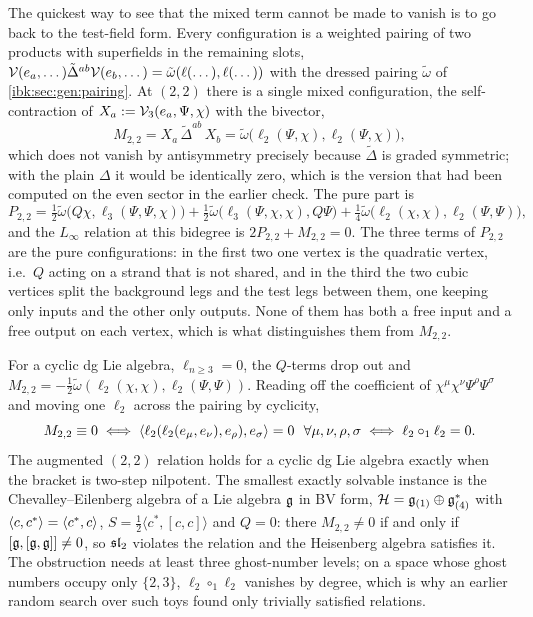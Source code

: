 The quickest way to see that the mixed term cannot be made to vanish is to go back to the test-field form. Every configuration is a weighted pairing of two products with superfields in the remaining slots, ${\mathcal{V}}(e_a,\dots)\tilde\Delta^{ab}{\mathcal{V}}(e_b,\dots)=\tilde\omega(\ell(\dots),\ell(\dots))$ with the dressed pairing $\tilde\omega$ of \cref{ibk:sec:gen:pairing}. At $(2,2)$ there is a single mixed configuration, the self-contraction of $X_a:={\mathcal{V}}_3(e_a,\Psi,\chi)$ with the bivector,
\begin{equation}
  \label{ibk:eq:comp:M22}
  M_{2,2}
    = X_a\,\tilde\Delta^{ab}\,X_b
    = \tilde\omega\bigl(\ell_2(\Psi,\chi),\ell_2(\Psi,\chi)\bigr),
\end{equation}
which does not vanish by antisymmetry precisely because $\tilde\Delta$ is graded symmetric; with the plain $\Delta$ it would be identically zero, which is the version that had been computed on the even sector in the earlier check. The pure part is
\begin{equation}
  \label{ibk:eq:comp:P22}
  P_{2,2}
    = \tfrac12\tilde\omega\bigl(Q\chi,\ell_3(\Psi,\Psi,\chi)\bigr)
      + \tfrac12\tilde\omega\bigl(\ell_3(\Psi,\chi,\chi),Q\Psi\bigr)
      + \tfrac14\tilde\omega\bigl(\ell_2(\chi,\chi),\ell_2(\Psi,\Psi)\bigr),
\end{equation}
and the $L_\infty$ relation at this bidegree is $2P_{2,2}+M_{2,2}=0$. The three terms of $P_{2,2}$ are the pure configurations: in the first two one vertex is the quadratic vertex, i.e.\ $Q$ acting on a strand that is not shared, and in the third the two cubic vertices split the background legs and the test legs between them, one keeping only inputs and the other only outputs. None of them has both a free input and a free output on each vertex, which is what distinguishes them from $M_{2,2}$.

For a cyclic dg Lie algebra, $\ell_{n\ge3}=0$, the $Q$-terms drop out and $M_{2,2}=-\frac12\tilde\omega(\ell_2(\chi,\chi),\ell_2(\Psi,\Psi))$. Reading off the coefficient of $\chi^\mu\chi^\nu\Psi^\rho\Psi^\sigma$ and moving one $\ell_2$ across the pairing by cyclicity,
\begin{equation}
  \label{ibk:eq:comp:dg-lie}
  M_{2,2}\equiv0
  \iff
  \braket{\ell_2(\ell_2(e_\mu,e_\nu),e_\rho),e_\sigma}=0\ \ \forall\mu,\nu,\rho,\sigma
  \iff
  \ell_2\circ_1\ell_2=0.
\end{equation}
The augmented $(2,2)$ relation holds for a cyclic dg Lie algebra exactly when the bracket is two-step nilpotent. The smallest exactly solvable instance is the Chevalley--Eilenberg algebra of a Lie algebra $\mathfrak{g}$ in BV form, ${\mathcal{H}}=\mathfrak{g}_{(1)}\oplus\mathfrak{g}^*_{(4)}$ with $\braket{c,c^*}=\langle c^*,c\rangle$, $S=\frac12\langle c^*,[c,c]\rangle$ and $Q=0$: there $M_{2,2}\neq0$ if and only if $[\mathfrak{g},[\mathfrak{g},\mathfrak{g}]]\neq0$, so $\mathfrak{sl}_2$ violates the relation and the Heisenberg algebra satisfies it. The obstruction needs at least three ghost-number levels; on a space whose ghost numbers occupy only $\{2,3\}$, $\ell_2\circ_1\ell_2$ vanishes by degree, which is why an earlier random search over such toys found only trivially satisfied relations.


